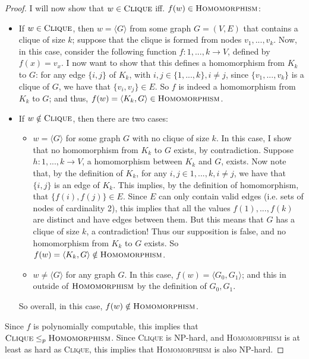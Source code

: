 \documentclass[a4paper,11pt]{scrartcl}
\newcommand{\encode}[1]{\langle #1 \rangle}
\begin{document}
\begin{proof}
    I will now show that $w \in \textsc{Clique}$ iff. $f(w) \in \textsc{Homomorphism}$:
    \begin{itemize}
        \item If $w \in \textsc{Clique}$, then $w = \encode{G}$ from some graph $G = (V, E)$ that contains a clique of size $k$; suppose that the clique is formed from nodes $v_1, ..., v_k$. Now, in this case, consider the following function $f : {1, ..., k} \rightarrow V$, defined by $f(x) = v_x$. I now want to show that this defines a homomorphism from $K_k$ to $G$: for any edge $\{ i, j \}$ of $K_k$, with $i, j \in \{ 1, ..., k \}, i \neq j$, since $\{v_1, ..., v_k \}$ is a clique of $G$, we have that $\{ v_i, v_j \} \in E$. So $f$ is indeed a homomorphism from $K_k$ to $G$; and thus, $f(w) = \encode{K_k, G} \in \textsc{Homomorphism}$.
        \item If $w \notin \textsc{Clique}$, then there are two cases:
            \begin{itemize}
                \item $w = \encode{G}$ for some graph $G$ with no clique of size $k$. In this case, I show that no homomorphism from $K_k$ to $G$ exists, by contradiction. Suppose $h : {1, ..., k} \rightarrow V$, a homomorphism between $K_k$ and $G$, exists. Now note that, by the definition of $K_k$, for any $i, j \in {1, ..., k}, i \neq j$, we have that $\{i, j\}$ is an edge of $K_k$. This implies, by the definition of homomorphism, that $\{ f(i), f(j) \} \in E$. Since $E$ can only contain valid edges (i.e. sets of nodes of cardinality 2), this implies that all the values $f(1), ..., f(k)$ are distinct and have edges between them. But this means that $G$ has a clique of size $k$, a contradiction! Thus our supposition is false, and no homomorphism from $K_k$ to $G$ exists. So $f(w) = \encode{K_k, G} \notin \textsc{Homomorphism}$.
                \item $w \neq \encode{G}$ for any graph $G$. In this case, $f(w) = \encode{G_0, G_1}$; and this in outside of $\textsc{Homomorphism}$ by the definition of $G_0, G_1$.
            \end{itemize}
            So overall, in this case, $f(w) \notin \textsc{Homomorphism}$.
    \end{itemize}
    Since $f$ is polynomially computable, this implies that $\textsc{Clique} \leq_p \textsc{Homomorphism}$. Since \textsc{Clique} is NP-hard, and \textsc{Homomorphism} is at least as hard as \textsc{Clique}, this implies that \textsc{Homomorphism} is also NP-hard.
\end{proof}
\end{document}
